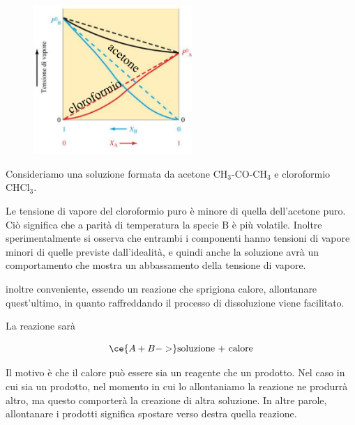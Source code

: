 \vspace{-0.2cm}\begin{minipage}{0.4\textwidth}
    \begin{figure}[H]
        \includegraphics[width=6cm]{immagini/tensione_di_vapore_sol_esotermica.png}
    \end{figure}
\end{minipage}
\begin{minipage}{0.6\textwidth}
    Consideriamo una soluzione formata da acetone CH$_3$-CO-CH$_3$ e cloroformio CHCl$_3$.

    Le tensione di vapore del cloroformio puro è minore di quella dell'acetone puro. Ciò significa che a parità di temperatura la specie B è più volatile. Inoltre sperimentalmente si osserva che entrambi i componenti hanno tensioni di vapore minori di quelle previste dall'idealità, e quindi anche la soluzione avrà un comportamento che mostra un abbassamento della tensione di vapore.
\end{minipage}
\E inoltre conveniente, essendo un reazione che sprigiona calore, allontanare quest'ultimo, in quanto raffreddando il processo di dissoluzione viene facilitato.

La reazione sarà

$$\ce{A + B ->} \text{soluzione + calore}$$

Il motivo è che il calore può essere sia un reagente che un prodotto. Nel caso in cui sia un prodotto, nel momento in cui lo allontaniamo la reazione ne produrrà altro, ma questo comporterà la creazione di altra soluzione. In altre parole, allontanare i prodotti significa spostare verso destra quella reazione.